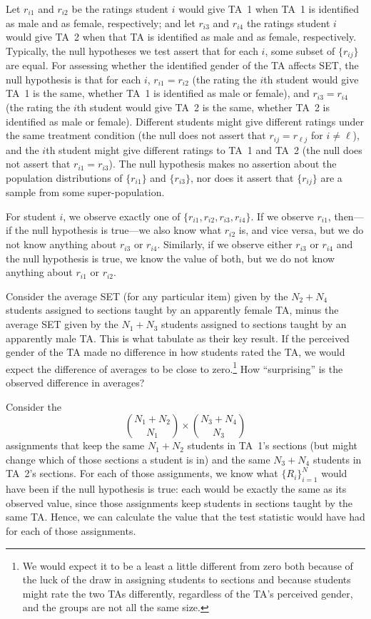 \documentclass[12pt]{article}
\newcommand{\beq}{\begin{equation}}
\newcommand{\eeq}{\end{equation}}
\begin{document}
Let $r_{i1}$ and $r_{i2}$ be the ratings student $i$ would give TA~1 when 
TA~1 is identified as male and as female, respectively; and let 
$r_{i3}$ and $r_{i4}$ the ratings student $i$ would give TA~2 when that TA
is identified as male and as female, respectively.
Typically, the null hypotheses we test assert that for each $i$, some subset of
$\{r_{ij}\}$ are  equal.
For assessing whether the identified gender of the TA affects SET,
the null hypothesis is that for each $i$,
$r_{i1} = r_{i2}$ (the rating the $i$th student would give TA~1 is the same,
whether TA~1 is identified as male or female), 
and $r_{i3} = r_{i4}$ (the rating the $i$th student would give TA~2 is
the same, whether TA~2 is identified as male or female).
Different students might give different ratings under the same treatment condition
(the null does not assert that $r_{ij} = r_{\ell j}$ for $i \ne \ell$), and
the $i$th student might 
give different ratings to TA~1 and TA~2
(the null does not assert that $r_{i1} = r_{i3}$).
The null hypothesis makes no assertion about the population distributions of 
$\{r_{i1}\}$ and $\{r_{i3}\}$, nor does it assert that $\{r_{ij}\}$ are 
a sample from some super-population.

For student $i$, we observe exactly one of $\{r_{i1}, r_{i2}, r_{i3}, r_{i4}\}$.
If we observe $r_{i1}$, then---if the null hypothesis is true---we also know what $r_{i2}$ is,
and vice versa, but we do not know anything about $r_{i3}$ or $r_{i4}$.
Similarly, if we observe either $r_{i3}$ or $r_{i4}$ and the null hypothesis is true,
we know the value of both, but we do not know anything about $r_{i1}$ or $r_{i2}$.

Consider the average SET (for any particular item)
given by the $N_2 + N_4$ students
assigned to sections taught by an apparently female TA, minus the 
average SET given by the $N_1 + N_3$ students
assigned to sections taught by an apparently male TA.
This is what \cite{MacNell2014} tabulate as their key result.
If the perceived gender of the TA made no difference in how students rated 
the TA, we would expect the difference of averages to be close to
zero.\footnote{%
  We would expect it to be a least a little different from zero both because of the luck of the draw
  in assigning students to sections and because students might rate the two TAs
  differently, regardless of the TA's perceived gender, and the groups are not all the same size.
}
How ``surprising'' is the observed difference in averages?

Consider the
\beq
  {{N_1 + N_2} \choose {N_1}} \times {{N_3+N_4} \choose {N_3}}
\eeq
assignments that keep the same $N_1 + N_2$ students in TA~1's
sections (but might change which of those sections a student is in) 
and the same $N_3 + N_4$ students in TA~2's sections.
For each of those assignments, we know what $\{R_i\}_{i=1}^N$ would
have been if the null hypothesis is true: each would be exactly the same
as its observed value, since those
assignments keep students in sections taught by the same TA.
Hence, we can calculate the value that the test statistic would have had for each
of those assignments.
\end{document}
